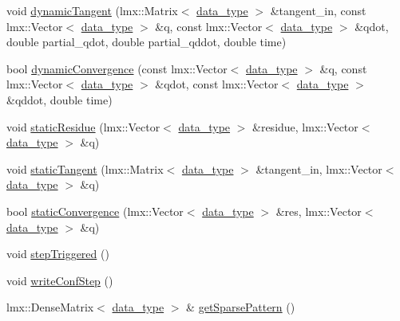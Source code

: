 \begin{DoxyCompactItemize}
\item 
void \hyperlink{classmknix_1_1_simulation_a226a281591cb1b0bac253a3dcce19e5b}{dynamic\-Tangent} (lmx\-::\-Matrix$<$ \hyperlink{namespacemknix_a16be4b246fbf2cceb141e3a179111020}{data\-\_\-type} $>$ \&tangent\-\_\-in, const lmx\-::\-Vector$<$ \hyperlink{namespacemknix_a16be4b246fbf2cceb141e3a179111020}{data\-\_\-type} $>$ \&q, const lmx\-::\-Vector$<$ \hyperlink{namespacemknix_a16be4b246fbf2cceb141e3a179111020}{data\-\_\-type} $>$ \&qdot, double partial\-\_\-qdot, double partial\-\_\-qddot, double time)
\item 
bool \hyperlink{classmknix_1_1_simulation_a0bb5d6c4c6eccc35e892b710af40616f}{dynamic\-Convergence} (const lmx\-::\-Vector$<$ \hyperlink{namespacemknix_a16be4b246fbf2cceb141e3a179111020}{data\-\_\-type} $>$ \&q, const lmx\-::\-Vector$<$ \hyperlink{namespacemknix_a16be4b246fbf2cceb141e3a179111020}{data\-\_\-type} $>$ \&qdot, const lmx\-::\-Vector$<$ \hyperlink{namespacemknix_a16be4b246fbf2cceb141e3a179111020}{data\-\_\-type} $>$ \&qddot, double time)
\item 
void \hyperlink{classmknix_1_1_simulation_a1a65d519f553ac9d060c526ae508f152}{static\-Residue} (lmx\-::\-Vector$<$ \hyperlink{namespacemknix_a16be4b246fbf2cceb141e3a179111020}{data\-\_\-type} $>$ \&residue, lmx\-::\-Vector$<$ \hyperlink{namespacemknix_a16be4b246fbf2cceb141e3a179111020}{data\-\_\-type} $>$ \&q)
\item 
void \hyperlink{classmknix_1_1_simulation_a4ec8a62eed31911238142b362f60f43e}{static\-Tangent} (lmx\-::\-Matrix$<$ \hyperlink{namespacemknix_a16be4b246fbf2cceb141e3a179111020}{data\-\_\-type} $>$ \&tangent\-\_\-in, lmx\-::\-Vector$<$ \hyperlink{namespacemknix_a16be4b246fbf2cceb141e3a179111020}{data\-\_\-type} $>$ \&q)
\item 
bool \hyperlink{classmknix_1_1_simulation_a3a9b6e1b8cf5a63ad6e3a7d2cce5d171}{static\-Convergence} (lmx\-::\-Vector$<$ \hyperlink{namespacemknix_a16be4b246fbf2cceb141e3a179111020}{data\-\_\-type} $>$ \&res, lmx\-::\-Vector$<$ \hyperlink{namespacemknix_a16be4b246fbf2cceb141e3a179111020}{data\-\_\-type} $>$ \&q)
\item 
void \hyperlink{classmknix_1_1_simulation_a9fd95351d7fe3ce2ba1991d6aae6a804}{step\-Triggered} ()
\item 
void \hyperlink{classmknix_1_1_simulation_a5d4227d2d500003664587afadecb1081}{write\-Conf\-Step} ()
\item 
lmx\-::\-Dense\-Matrix$<$ \hyperlink{namespacemknix_a16be4b246fbf2cceb141e3a179111020}{data\-\_\-type} $>$ \& \hyperlink{classmknix_1_1_simulation_a7531cdc469c142e3b2d7f4e1738d65c9}{get\-Sparse\-Pattern} ()
\end{DoxyCompactItemize}
